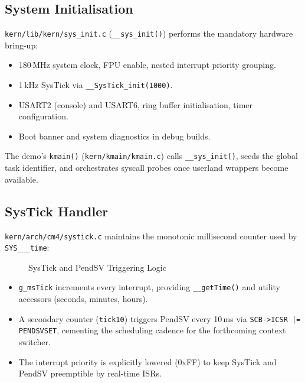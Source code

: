 \documentclass[11pt,a4paper]{article}
\newcommand{\file}[1]{\texttt{#1}}
\newcommand{\reg}[1]{\texttt{#1}}
\begin{document}
\subsection{System Initialisation}
\file{kern/lib/kern/sys\_init.c} (\texttt{\_\_sys\_init()}) performs the mandatory hardware bring-up:
\begin{itemize}[leftmargin=1.5em]
  \item 180\,MHz system clock, FPU enable, nested interrupt priority grouping.
  \item 1\,kHz SysTick via \texttt{\_\_SysTick\_init(1000)}.
  \item USART2 (console) and USART6, ring buffer initialisation, timer configuration.
  \item Boot banner and system diagnostics in debug builds.
\end{itemize}
The demo's \texttt{kmain()} (\file{kern/kmain/kmain.c}) calls \texttt{\_\_sys\_init()}, seeds the global task identifier, and orchestrates syscall probes once userland wrappers become available.

\subsection{SysTick Handler}
\file{kern/arch/cm4/systick.c} maintains the monotonic millisecond counter used by \texttt{SYS\_\_\_time}:

\begin{figure}[H]
\centering
{}
\caption{SysTick and PendSV Triggering Logic}
\label{fig:systick-flow}
\end{figure}

\begin{itemize}[leftmargin=1.5em]
  \item \texttt{g\_msTick} increments every interrupt, providing \texttt{\_\_getTime()} and utility accessors (seconds, minutes, hours).
  \item A secondary counter (\texttt{tick10}) triggers PendSV every 10\,ms via \reg{SCB->ICSR |= PENDSVSET}, cementing the scheduling cadence for the forthcoming context switcher.
  \item The interrupt priority is explicitly lowered (0xFF) to keep SysTick and PendSV preemptible by real-time ISRs.
\end{itemize}
\end{document}
